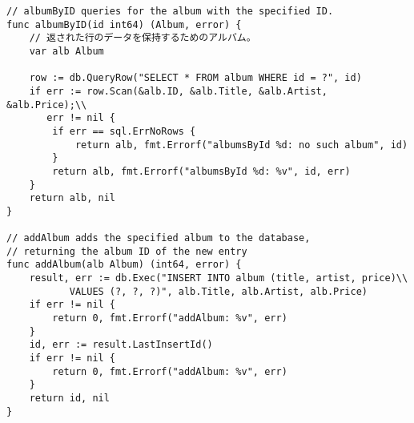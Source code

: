 \begin{lstlisting}[numbers=none]
// albumByID queries for the album with the specified ID.
func albumByID(id int64) (Album, error) {
    // 返された行のデータを保持するためのアルバム。
    var alb Album

    row := db.QueryRow("SELECT * FROM album WHERE id = ?", id)
    if err := row.Scan(&alb.ID, &alb.Title, &alb.Artist, &alb.Price);\\
       err != nil {
        if err == sql.ErrNoRows {
            return alb, fmt.Errorf("albumsById %d: no such album", id)
        }
        return alb, fmt.Errorf("albumsById %d: %v", id, err)
    }
    return alb, nil
}

// addAlbum adds the specified album to the database,
// returning the album ID of the new entry
func addAlbum(alb Album) (int64, error) {
    result, err := db.Exec("INSERT INTO album (title, artist, price)\\
           VALUES (?, ?, ?)", alb.Title, alb.Artist, alb.Price)
    if err != nil {
        return 0, fmt.Errorf("addAlbum: %v", err)
    }
    id, err := result.LastInsertId()
    if err != nil {
        return 0, fmt.Errorf("addAlbum: %v", err)
    }
    return id, nil
}
\end{lstlisting}
